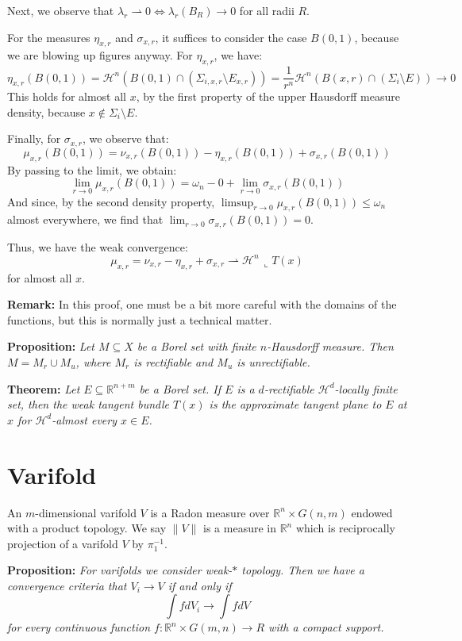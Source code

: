 \documentclass{article}
\begin{document}
\vspace{1ex}
Next, we observe that $\lambda_r\rightharpoonup 0\Leftrightarrow \lambda_r(B_R)\rightarrow 0$ for all radii $R$.

\vspace{1ex}
For the measures $\eta_{x,r}$ and $\sigma_{x,r}$, it suffices to consider the case $B(0,1)$, because we are blowing up figures anyway. For $\eta_{x,r}$, we have:
\[\eta_{x,r}(B(0, 1))=\mathcal H^n(B(0, 1)\cap(\Sigma_{i,x,r}\setminus E_{x,r}))=
\frac{1}{r^n}\mathcal H^n(B(x,r)\cap(\Sigma_i\setminus E))\rightarrow 0\]
This holds for almost all $x$, by the first property of the upper Hausdorff measure density, because $x \notin \Sigma_i \setminus E$.

\vspace{1ex}
Finally, for $\sigma_{x,r}$, we observe that:
\[\mu_{x,r}(B(0,1))=\nu_{x,r}(B(0,1))-\eta_{x,r}(B(0,1))+\sigma_{x,r}(B(0,1))\]
By passing to the limit, we obtain:
\[\lim_{r\to 0}\mu_{x,r}(B(0,1))=\omega_n-0+\lim_{r\to 0}\sigma_{x,r}(B(0,1))\]
And since, by the second density property, $\limsup_{r\to 0}\mu_{x,r}(B(0,1)) \le \omega_n$ almost everywhere, we find that $\lim_{r\to 0}\sigma_{x,r}(B(0,1))=0$.

Thus, we have the weak convergence:
\[\mu_{x,r}=\nu_{x,r}-\eta_{x,r}+\sigma_{x,r}\rightharpoonup\mathcal H^n\,\llcorner T(x)\]
for almost all $x$.

\vspace{1ex}
\textbf{Remark:} In this proof, one must be a bit more careful with the domains of the functions, but this is normally just a technical matter.

\vspace{2ex}
\textbf{Proposition:} \textit{Let $M\subseteq X$ be a Borel set with finite
$n$-Hausdorff measure. Then $M=M_r\cup M_u$, where $M_r$ is rectifiable
and $M_u$ is unrectifiable.}

\vspace{2ex}
\textbf{Theorem:} \textit{Let $E\subseteq\mathbb R^{n+m}$ be a Borel set. If $E$
is a $d$-rectifiable $\mathcal H^d$-locally finite set, then the weak tangent
bundle $T(x)$ is the approximate tangent plane to $E$ at $x$ for $\mathcal H^d$-almost
every $x\in E$.}

\section{Varifold}
An $m$-dimensional varifold $V$ is a Radon measure over $\mathbb{R}^n\times
G(n,m)$ endowed with a product topology. We say $\|V\|$ is a measure in
$\mathbb{R}^n$ which is reciprocally projection of a varifold $V$ by $\pi_1^{-1}$.

\vspace{2ex}
\textbf{Proposition:} \textit{For varifolds we consider weak-$*$ topology. Then we have a
convergence criteria that $V_i\rightarrow V$ if and only if
\[\int fdV_i\rightarrow\int fdV\]
for every continuous function $f:\mathbb{R}^n\times G(m,n)\rightarrow R$ with a
compact support.}
\vspace{1ex}

\medskip


\end{document}
